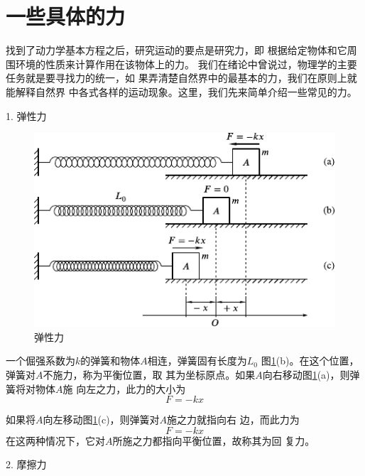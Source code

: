 \section{一些具体的力}\label{sec:03.04}

找到了动力学基本方程之后，研究运动的要点是研究力，即
根据给定物体和它周围环境的性质来计算作用在该物体上的力。
我们在绪论中曾说过，物理学的主要任务就是要寻找力的统一，如
果弄清楚自然界中的最基本的力，我们在原则上就能解释自然界
中各式各样的运动现象。这里，我们先来简单介绍一些常见的力。

\textsf{1. 弹性力}
\begin{figure}[!h]
  \centering
  \includegraphics{figure/fig03.03}
  \caption{弹性力}
  \label{fig:03.03}
\end{figure}

一个倔强系数为$ k $的弹簧和物体$ A $相连，弹簧固有长度为$ L _ { 0 } $
\lbr 图\ref{fig:03.03}(b)\rbr 。在这个位置，弹簧对$ A $不施力，称为平衡位置，取
其为坐标原点。如果$ A $向右移动\lbr 图\ref{fig:03.03}(a)\rbr ，则弹簧将对物体$ A $施
向左之力，此力的大小为
\begin{equation}\label{eqn:03.04.01}
  F = - k x
\end{equation}

如果将$ A $向左移动\lbr 图\ref{fig:03.03}(c)\rbr ，则弹簧对$ A $施之力就指向右
边，而此力为
\begin{equation*}
  F = - k x
\end{equation*}
在这两种情况下，它对$ A $所施之力都指向平衡位置，故称其为回
复力。

\textsf{2. 摩擦力}

